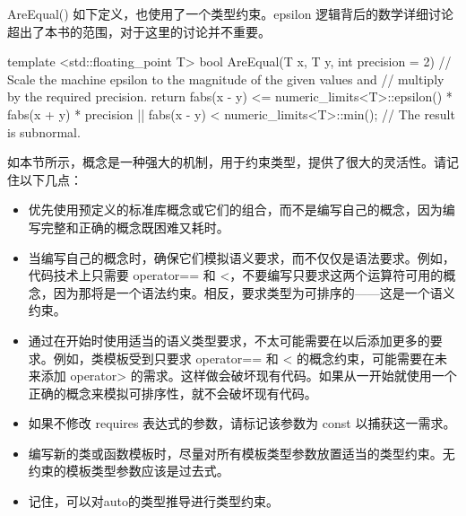 AreEqual() 如下定义，也使用了一个类型约束。epsilon 逻辑背后的数学详细讨论超出了本书的范围，对于这里的讨论并不重要。

\begin{cpp}
template <std::floating_point T>
bool AreEqual(T x, T y, int precision = 2)
{
    // Scale the machine epsilon to the magnitude of the given values and
    // multiply by the required precision.
    return fabs(x - y) <= numeric_limits<T>::epsilon() * fabs(x + y) * precision
        || fabs(x - y) < numeric_limits<T>::min(); // The result is subnormal.
}
\end{cpp}


如本节所示，概念是一种强大的机制，用于约束类型，提供了很大的灵活性。请记住以下几点：

\begin{itemize}
\item
优先使用预定义的标准库概念或它们的组合，而不是编写自己的概念，因为编写完整和正确的概念既困难又耗时。

\item
当编写自己的概念时，确保它们模拟语义要求，而不仅仅是语法要求。例如，代码技术上只需要 operator== 和 <，不要编写只要求这两个运算符可用的概念，因为那将是一个语法约束。相反，要求类型为可排序的——这是一个语义约束。

\item
通过在开始时使用适当的语义类型要求，不太可能需要在以后添加更多的要求。例如，类模板受到只要求 operator== 和 < 的概念约束，可能需要在未来添加 operator> 的需求。这样做会破坏现有代码。如果从一开始就使用一个正确的概念来模拟可排序性，就不会破坏现有代码。

\item
如果不修改 requires 表达式的参数，请标记该参数为 const 以捕获这一需求。

\item
编写新的类或函数模板时，尽量对所有模板类型参数放置适当的类型约束。无约束的模板类型参数应该是过去式。

\item
记住，可以对auto的类型推导进行类型约束。
\end{itemize}

















